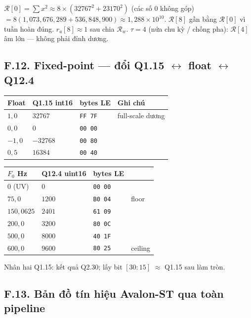 $\mathcal{R}[0]=\sum x^2\approx 8\times(32767^2+23170^2)$ (các số 0 không góp) $=8(1{,}073{,}676{,}289+536{,}848{,}900)\approx1{,}288\times10^{10}$.
$\mathcal{R}[8]$ gần bằng $\mathcal{R}[0]$ vì tuần hoàn đúng. $r_a[8]\approx1$ sau chia $\mathcal{R}_w$. $\tau=4$ (nửa chu kỳ / chống pha): $\mathcal{R}[4]$ âm lớn --- không phải đỉnh dương.

\subsection*{F.12. Fixed-point --- đổi Q1.15 $\leftrightarrow$ float $\leftrightarrow$ Q12.4}

\begin{center}\small
\begin{tabular}{@{}llll@{}}
\toprule
Float & Q1.15 int16 & bytes LE & Ghi chú \\
\midrule
$1{,}0$ & $32767$ & \texttt{FF 7F} & full-scale dương \\
$0{,}0$ & $0$ & \texttt{00 00} & \\
$-1{,}0$ & $-32768$ & \texttt{00 80} & \\
$0{,}5$ & $16384$ & \texttt{00 40} & \\
\bottomrule
\end{tabular}
\end{center}

\begin{center}\small
\begin{tabular}{@{}llll@{}}
\toprule
$F_0$ Hz & Q12.4 uint16 & bytes LE & \\
\midrule
$0$ (UV) & $0$ & \texttt{00 00} & \\
$75{,}0$ & $1200$ & \texttt{B0 04} & floor \\
$150{,}0625$ & $2401$ & \texttt{61 09} & \\
$200{,}0$ & $3200$ & \texttt{80 0C} & \\
$500{,}0$ & $8000$ & \texttt{40 1F} & \\
$600{,}0$ & $9600$ & \texttt{80 25} & ceiling \\
\bottomrule
\end{tabular}
\end{center}

Nhân hai Q1.15: kết quả Q2.30; lấy bit $[30{:}15]$ $\approx$ Q1.15 sau làm tròn.

\subsection*{F.13. Bản đồ tín hiệu Avalon-ST qua toàn pipeline}

